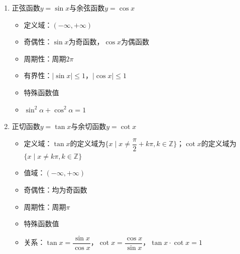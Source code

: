 \documentclass[../book.tex]{subfiles}
\begin{document}
    \begin{enumerate}
        \item 正弦函数$y = \sin x$与余弦函数$y = \cos x$
        \begin{itemize}
            \item 定义域：$(-\infty, +\infty)$
            \item 奇偶性：$\sin x$为奇函数，$\cos x$为偶函数
            \item 周期性：周期$2\pi$
            \item 有界性：$|\sin x| \leq 1$，$|\cos x| \leq 1$
            \item 特殊函数值
            \item $\sin^2 \alpha + \cos^2 \alpha = 1$
        \end{itemize}
        \item 正切函数$y = \tan x$与余切函数$y = \cot x$
        \begin{itemize}
            \item 定义域：$\tan x$的定义域为$\{x \mid x \neq \dfrac{\pi}{2} + k\pi, k \in \mathbb{Z}\}$；$\cot x$的定义域为$\{x \mid x \neq k\pi, k \in \mathbb{Z}\}$
            \item 值域：$(-\infty, +\infty)$
            \item 奇偶性：均为奇函数
            \item 周期性：周期$\pi$
            \item 特殊函数值
            \item 关系：$\tan x = \dfrac{\sin x}{\cos x}$，$\cot x = \dfrac{\cos x}{\sin x}$，$\tan x \cdot \cot x = 1$

\end{itemize}
\end{enumerate}
\end{document}
